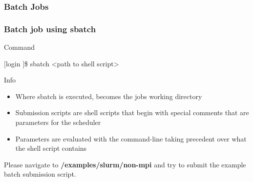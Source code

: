 \subsubsection{Batch Jobs}
\begin{frame}
  \frametitle{Batch job using sbatch}
  \begin{block}{Command}
		\begin{semiverbatim}$[$login \ctilde$]$\$ sbatch <path to shell script>\end{semiverbatim}	
  \end{block}
  \begin{block}{Info}
		\begin{itemize}
		\item Where sbatch is executed, becomes the jobs working directory
		\item Submission scripts are shell scripts that begin with special comments that are parameters for the scheduler
		\item Parameters are evaluated with the command-line taking precedent over what the shell script contains
		\end{itemize}
	\end{block}
	  \btVFill
  \begin{center}Please navigate to \textbf{\ctilde/examples/slurm/non-mpi} and try to submit the example batch submission script.\end{center}
\end{frame}



